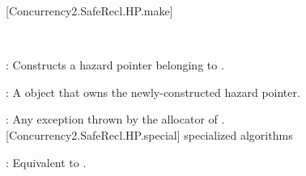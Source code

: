 [Concurrency2.SafeRecl.HP.make]{}

\\
\hspace*{1.1em}

\pnum
{}: Constructs a hazard pointer belonging to .

\pnum
{}: A  object that owns the newly-constructed hazard pointer.

\pnum
{}: Any exception thrown by the allocator of .
\\

[Concurrency2.SafeRecl.HP.special]{ specialized algorithms}


\pnum
{}: Equivalent to .
\\
